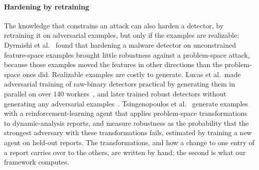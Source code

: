 \paragraph{Hardening by retraining}
The knowledge that constrains an attack can also harden a detector, by retraining it on adversarial examples, but only
if the examples are realizable: Dyrmishi et al.~\cite{dyrmishi2023empirical} found that hardening a malware detector on
unconstrained feature-space examples brought little robustness against a problem-space attack, because those examples
moved the features in other directions than the problem-space ones did. Realizable examples are costly to generate.
Lucas et al.\ made adversarial training of raw-binary detectors practical by generating them in parallel on over 140
workers~\cite{lucas2023adversarial}, and later trained robust detectors without generating any adversarial
examples~\cite{lucas2024training}. Tsingenopoulos et al.~\cite{tsingenopoulos2024train} generate examples with a
reinforcement-learning agent that applies problem-space transformations to dynamic-analysis reports, and measure
robustness as the probability that the strongest adversary with these transformations fails, estimated by training a
new agent on held-out reports. The transformations, and how a change to one entry of a report carries over to the
others, are written by hand; the second is what our framework computes.

